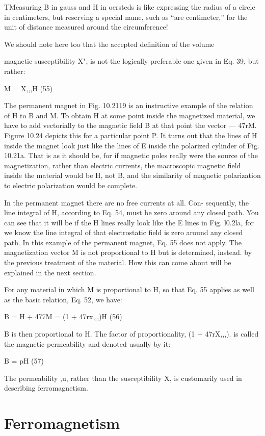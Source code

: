 {{{TMeasuring B in gauss and H in oersteds is like expressing the radius of a circle in
centimeters, but reserving a special name, such as ``are centimeter,'' for the unit of distance
measured around the circumference!

We should note here too that the accepted definition of the volume

magnetic susceptibility X", is not the logically preferable one given
in Eq. 39, but rather:

M = X,,,H (55)

The permanent magnet in Fig. 10.2119 is an instructive example
of the relation of H to B and M. To obtain H at some point inside
the magnetized material, we have to add vectorially to the magnetic
field B at that point the vector  --- 47rM. Figure 10.24 depicts this
for a particular point P. It turns out that the lines of H inside the
magnet look just like the lines of E inside the polarized cylinder of
Fig. 10.21a. That is as it should be, for if magnetic poles really were
the source of the magnetization, rather than electric currents, the
macroscopic magnetic field inside the material would be H, not B,
and the similarity of magnetic polarization to electric polarization
would be complete.

In the permanent magnet there are no free currents at all. Con-
sequently, the line integral of H, according to Eq. 54, must be zero
around any closed path. You can see that it will be if the H lines
really look like the E lines in Fig. l0.2la, for we know the line integral
of that electrostatic field is zero around any closed path. In this
example of the permanent magnet, Eq. 55 does not apply. The
magnetization vector M is not proportional to H but is determined,
instead. by the previous treatment of the material. How this can
come about will be explained in the next section.

For any material in which M is proportional to H, so that Eq. 55
applies as well as the basic relation, Eq. 52, we have:

B = H + 477M = (1 + 47rx,,,)H (56)

B is then proportional to H. The factor of proportionality,
(1 + 47rX,,,). is called the magnetic permeability and denoted usually
by it:

B = pH (57)

The permeability ,u, rather than the susceptibility X, is customarily
used in describing ferromagnetism.

\section{Ferromagnetism}

}}}
